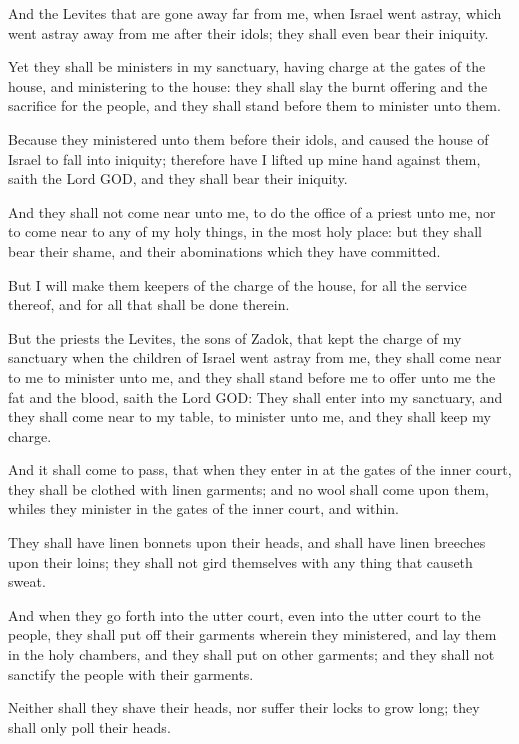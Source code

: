 \Verse And the Levites that are gone away far from me, when Israel went astray, which went astray away from me after their idols; they shall even bear their iniquity.

\Verse Yet they shall be ministers in my sanctuary, having charge at the gates of the house, and ministering to the house: they shall slay the burnt offering and the sacrifice for the people, and they shall stand before them to minister unto them.

\Verse Because they ministered unto them before their idols, and caused the house of Israel to fall into iniquity; therefore have I lifted up mine hand against them, saith the Lord GOD, and they shall bear their iniquity.

\Verse And they shall not come near unto me, to do the office of a priest unto me, nor to come near to any of my holy things, in the most holy place: but they shall bear their shame, and their abominations which they have committed.

\Verse But I will make them keepers of the charge of the house, for all the service thereof, and for all that shall be done therein.

\Verse But the priests the Levites, the sons of Zadok, that kept the charge of my sanctuary when the children of Israel went astray from me, they shall come near to me to minister unto me, and they shall stand before me to offer unto me the fat and the blood, saith the Lord GOD: \Verse They shall enter into my sanctuary, and they shall come near to my table, to minister unto me, and they shall keep my charge.

\Verse And it shall come to pass, that when they enter in at the gates of the inner court, they shall be clothed with linen garments; and no wool shall come upon them, whiles they minister in the gates of the inner court, and within.

\Verse They shall have linen bonnets upon their heads, and shall have linen breeches upon their loins; they shall not gird themselves with any thing that causeth sweat.

\Verse And when they go forth into the utter court, even into the utter court to the people, they shall put off their garments wherein they ministered, and lay them in the holy chambers, and they shall put on other garments; and they shall not sanctify the people with their garments.

\Verse Neither shall they shave their heads, nor suffer their locks to grow long; they shall only poll their heads.


